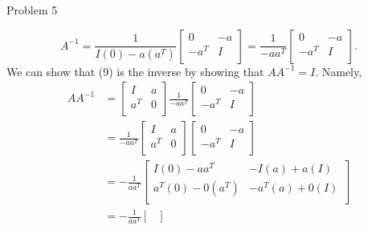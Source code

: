 \begin{problem}{Problem 5}
\begin{highlight}
        \begin{equation}
            A^{-1} = \frac{1}{I(0) - a(a^{T})} 
            \begin{bmatrix}
                0 & -a \\
                -a^{T} & I \\
            \end{bmatrix}
            = \frac{1}{-aa^{T}}
            \begin{bmatrix}
                0 & -a \\
                -a^{T} & I \\
            \end{bmatrix}.
        \end{equation}
        We can show that (9) is the inverse by showing that $AA^{-1} = I$. Namely,
        \begin{align}
            AA^{-1} & = 
            \begin{bmatrix}
                I & a \\
                a^{T} & 0 \\
            \end{bmatrix}
            \frac{1}{-aa^{T}}
            \begin{bmatrix}
                0 & -a \\
                -a^{T} & I \\
            \end{bmatrix} \\
            & = \frac{1}{-aa^{T}}
            \begin{bmatrix}
                I & a \\
                a^{T} & 0 \\
            \end{bmatrix}
            \begin{bmatrix}
                0 & -a \\
                -a^{T} & I \\
            \end{bmatrix} \\
            & = -\frac{1}{aa^{T}}
            \begin{bmatrix}
                I(0) - aa^{T} & -I(a) + a(I) \\
                a^{T}(0) - 0(a^{T}) & -a^{T}(a) + 0(I) \\
            \end{bmatrix} \\
            & = -\frac{1}{aa^{T}}
            \begin{bmatrix}

\end{bmatrix}
\end{align}
\end{highlight}
\end{problem}
